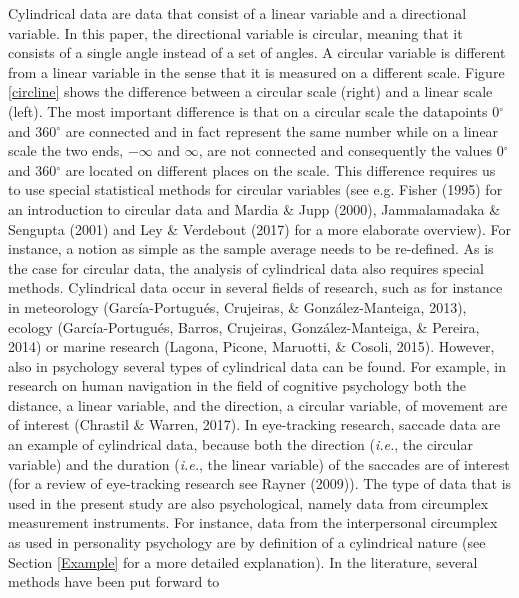 \documentclass[12pt,]{article}
\begin{document}
Cylindrical data are data that consist of a linear variable and a
directional variable. In this paper, the directional variable is
circular, meaning that it consists of a single angle instead of a set of
angles. A circular variable is different from a linear variable in the
sense that it is measured on a different scale. Figure \ref{circline}
shows the difference between a circular scale (right) and a linear scale
(left). The most important difference is that on a circular scale the
datapoints 0\(^\circ\) and 360\(^\circ\) are connected and in fact
represent the same number while on a linear scale the two ends,
\(-\infty\) and \(\infty\), are not connected and consequently the
values 0\(^\circ\) and 360\(^\circ\) are located on different places on
the scale. This difference requires us to use special statistical
methods for circular variables (see e.g. Fisher (1995) for an
introduction to circular data and Mardia \& Jupp (2000), Jammalamadaka
\& Sengupta (2001) and Ley \& Verdebout (2017) for a more elaborate
overview). For instance, a notion as simple as the sample average needs
to be re-defined. As is the case for circular data, the analysis of
cylindrical data also requires special methods.\newline
\indent Cylindrical data occur in several fields of research, such as
for instance in meteorology (García-Portugués, Crujeiras, \&
González-Manteiga, 2013), ecology (García-Portugués, Barros, Crujeiras,
González-Manteiga, \& Pereira, 2014) or marine research (Lagona, Picone,
Maruotti, \& Cosoli, 2015). However, also in psychology several types of
cylindrical data can be found. For example, in research on human
navigation in the field of cognitive psychology both the distance, a
linear variable, and the direction, a circular variable, of movement are
of interest (Chrastil \& Warren, 2017). In eye-tracking research,
saccade data are an example of cylindrical data, because both the
direction (\emph{i.e.}, the circular variable) and the duration
(\emph{i.e.}, the linear variable) of the saccades are of interest (for
a review of eye-tracking research see Rayner (2009)).\newline
\indent The type of data that is used in the present study are also
psychological, namely data from circumplex measurement instruments. For
instance, data from the interpersonal circumplex as used in personality
psychology are by definition of a cylindrical nature (see Section
\ref{Example} for a more detailed explanation).\newline
\indent In the literature, several methods have been put forward to
\end{document}
